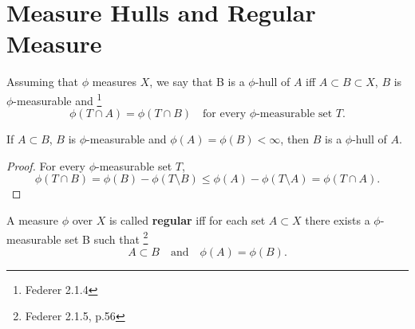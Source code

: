 \section{Measure Hulls and Regular Measure}

\begin{definition}
Assuming that $\phi$ measures $X$, we say that B is a $\phi$-hull of $A$ iff
$A\subset B\subset X$, $B$ is $\phi$-measurable and
\footnote{Federer 2.1.4}
\[
  \phi(T\cap A)=\phi(T\cap B) \quad \text{for every $\phi$-measurable set $T$}.
\]
\end{definition}

\begin{proposition} \label{P:hull}
If $A\subset B$, $B$ is $\phi$-measurable and $\phi(A)=\phi(B)<\infty$, then $B$
is a $\phi$-hull of $A$.
\end{proposition}

\begin{proof}
For every $\phi$-measurable set $T$,
\[
  \phi(T\cap B)=\phi(B)-\phi(T\setminus B) 
    \le \phi(A)-\phi(T\setminus A)=\phi(T\cap A).
\]
\end{proof}

\begin{definition}
A measure $\phi$ over $X$ is called \textbf{regular} iff for each set $A\subset
X$ there exists a $\phi$-measurable set B such that
\footnote{Federer 2.1.5, p.56}
\[
  A\subset B\quad \text{and} \quad \phi(A)=\phi(B).
\]
\end{definition}


